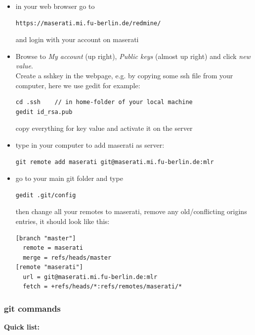 \begin{itemize}
\item in your web browser go to
\begin{verbatim}
https://maserati.mi.fu-berlin.de/redmine/
\end{verbatim}
and login with your account on maserati

\item  Browse to \textit{My account} (up right), \textit{Public
keys} (almost up right) and click \textit{new value}.  \\
Create a sshkey in the webpage, e.g. by copying some ssh file from your
computer, here we use gedit for example:
\begin{verbatim}
cd .ssh    // in home-folder of your local machine
gedit id_rsa.pub
\end{verbatim} 
copy everything for key value and activate it on the server
\item type in your computer to add maserati as server:
\begin{verbatim}
git remote add maserati git@maserati.mi.fu-berlin.de:mlr 
\end{verbatim}
\item 
go to your main git folder and type
\begin{verbatim}
gedit .git/config
\end{verbatim}
then change all your remotes to maserati, remove any old/conflicting
origins entries, it should look like this:
\begin{verbatim}
[branch "master"]
  remote = maserati
  merge = refs/heads/master
[remote "maserati"]
  url = git@maserati.mi.fu-berlin.de:mlr
  fetch = +refs/heads/*:refs/remotes/maserati/*
\end{verbatim}
\end{itemize}





\subsubsection{git commands}


\textbf{Quick list:}


